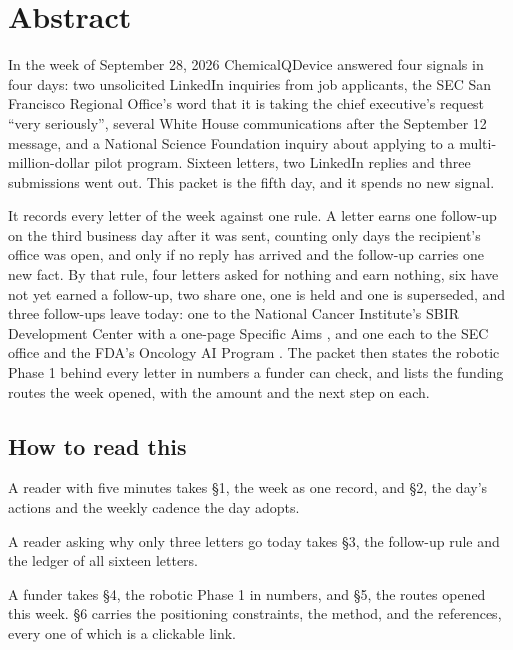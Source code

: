 \section*{Abstract}

In the week of September 28, 2026 ChemicalQDevice answered four signals in four
days: two unsolicited LinkedIn inquiries from job applicants, the SEC San
Francisco Regional Office's word that it is taking the chief executive's request
``very seriously'', several White House communications after the September 12
message, and a National Science Foundation inquiry about applying to a
multi-million-dollar pilot program. Sixteen letters, two LinkedIn replies and
three submissions went out. This packet is the fifth day, and it spends no new
signal.

It records every letter of the week against one rule. A letter earns one
follow-up on the third business day after it was sent, counting only days the
recipient's office was open, and only if no reply has arrived and the follow-up
carries one new fact. By that rule, four letters asked for nothing and earn
nothing, six have not yet earned a follow-up, two share one, one is held and one
is superseded, and three follow-ups leave today: one to the National Cancer
Institute's SBIR Development Center with a one-page Specific Aims
\cite{ncisbir2026,ncisbirpd2026}, and one each to the SEC office
\cite{secsf2026} and the FDA's Oncology AI Program \cite{fdaoceai2026}. The
packet then states the robotic Phase 1 behind every letter in numbers a funder
can check, and lists the funding routes the week opened, with the amount and the
next step on each.

\subsection*{How to read this}

A reader with five minutes takes \S1, the week as one record, and \S2, the day's
actions and the weekly cadence the day adopts.

A reader asking why only three letters go today takes \S3, the follow-up rule and
the ledger of all sixteen letters.

A funder takes \S4, the robotic Phase 1 in numbers, and \S5, the routes opened
this week. \S6 carries the positioning constraints, the method, and the
references, every one of which is a clickable link.
